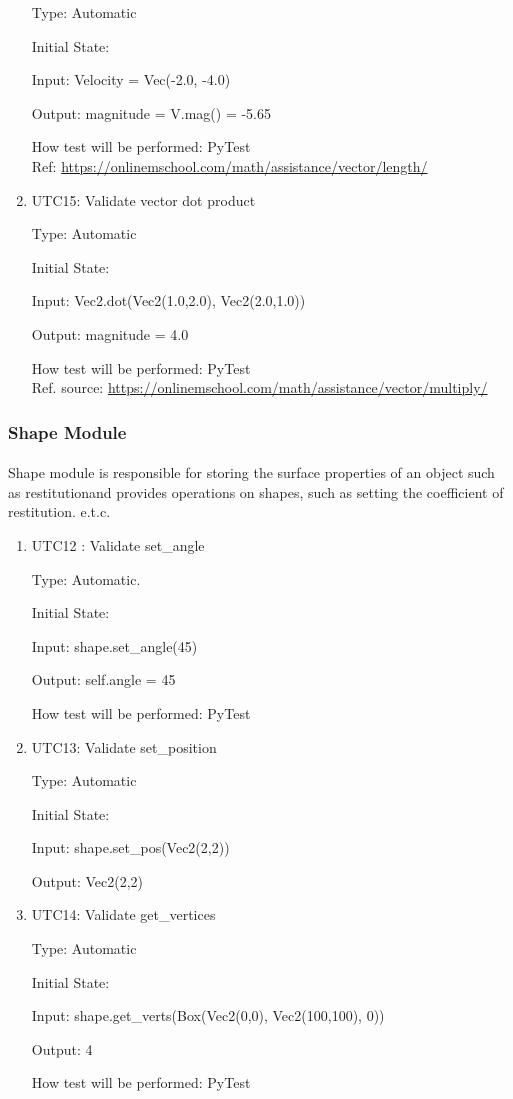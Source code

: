 \documentclass[12pt, titlepage]{article}
\begin{document}
\begin{enumerate}
	Type: Automatic
	
	Initial State: 
	
	Input: Velocity = Vec(-2.0, -4.0)
	
	Output: magnitude = V.mag() = -5.65
	
	How test will be performed: PyTest\\
	Ref: \url{https://onlinemschool.com/math/assistance/vector/length/}
	\item{UTC15}{: Validate vector dot product\\}
	
	Type: Automatic
	
	Initial State: 
	
	Input: Vec2.dot(Vec2(1.0,2.0), Vec2(2.0,1.0))
	
	Output: magnitude = 4.0
	
	How test will be performed: PyTest\\
	Ref. source: \url{https://onlinemschool.com/math/assistance/vector/multiply/}
	
	
\end{enumerate}

\subsubsection{Shape Module}

\paragraph{}
Shape module is responsible for storing the surface properties of an object such as restitutionand provides operations on shapes, such as setting the coefficient of restitution. e.t.c.
\begin{enumerate}
	
	
	\item{UTC12} {: Validate set\_angle \\}
	
	Type: Automatic.
	
	Initial State: 
	
	Input: shape.set\_angle(45)
	
	Output: self.angle = 45
	
	How test will be performed: PyTest 
	
	\item{UTC13}{: Validate set\_position\\}
	
	Type: Automatic
	
	Initial State: 
	
	Input: shape.set\_pos(Vec2(2,2))
	
	Output: Vec2(2,2)
	
	\item{UTC14}{: Validate get\_vertices\\}
	
	Type: Automatic
	
	Initial State: 
	
	Input: shape.get\_verts(Box(Vec2(0,0), Vec2(100,100), 0)) 
	
	Output: 4
	
	How test will be performed: PyTest
	

\end{enumerate}
\end{document}
